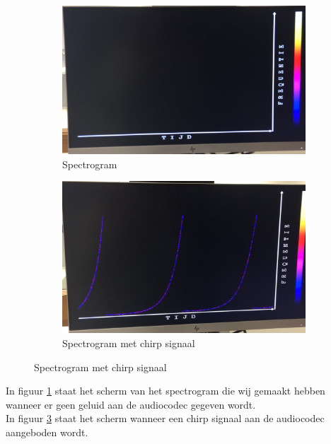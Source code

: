 \documentclass[a4paper,kul]{kulakarticle} %
\begin{document}
\begin{figure}[H]
	\centering
	\begin{subfigure}{.5\textwidth}
		\centering
		\includegraphics[width=0.9\linewidth]{Spectrogram_leeg.jpg}
		\caption{Spectrogram}
		\label{fig:spectrogram_leeg}
	\end{subfigure}%
	\begin{subfigure}{.5\textwidth}
		\centering
		\includegraphics[width=0.9\linewidth]{Spectrogram_chirp.jpg}
		\caption{Spectrogram met chirp signaal}
		\label{fig:spectrogram_chirp}
	\end{subfigure}
	
\end{figure}

In figuur \ref{fig:spectrogram_leeg} staat het scherm van het spectrogram die wij gemaakt hebben wanneer er geen geluid aan de audiocodec gegeven wordt. \\
In figuur \ref{fig:spectrogram_chirp} staat het scherm wanneer een chirp signaal aan de audiocodec aangeboden wordt.
\end{document}
